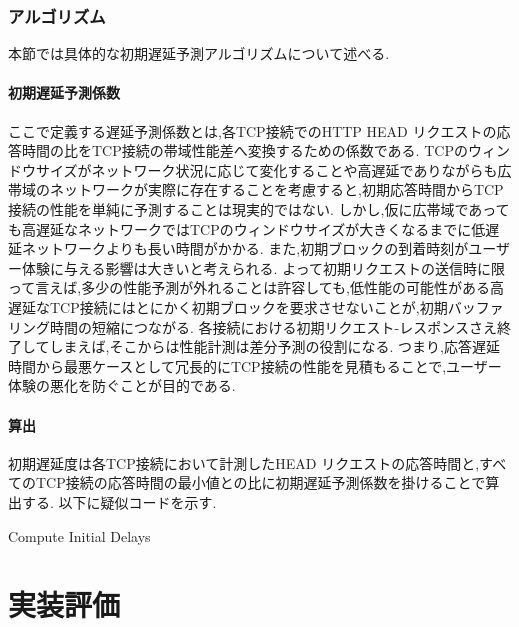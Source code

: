 \documentclass[a4j,12pt]{gradthesis_utf8}
\begin{document}
\newpage

\subsection{アルゴリズム}
\label{yosokuhouhou}
本節では具体的な初期遅延予測アルゴリズムについて述べる.

\subsubsection{初期遅延予測係数}
ここで定義する遅延予測係数とは,各TCP接続でのHTTP HEAD リクエストの応答時間の比をTCP接続の帯域性能差へ変換するための係数である.
TCPのウィンドウサイズがネットワーク状況に応じて変化することや高遅延でありながらも広帯域のネットワークが実際に存在することを考慮すると,初期応答時間からTCP接続の性能を単純に予測することは現実的ではない.
しかし,仮に広帯域であっても高遅延なネットワークではTCPのウィンドウサイズが大きくなるまでに低遅延ネットワークよりも長い時間がかかる.
また,初期ブロックの到着時刻がユーザー体験に与える影響は大きいと考えられる.
よって初期リクエストの送信時に限って言えば,多少の性能予測が外れることは許容しても,低性能の可能性がある高遅延なTCP接続にはとにかく初期ブロックを要求させないことが,初期バッファリング時間の短縮につながる.
各接続における初期リクエスト-レスポンスさえ終了してしまえば,そこからは性能計測は差分予測の役割になる.
つまり,応答遅延時間から最悪ケースとして冗長的にTCP接続の性能を見積もることで,ユーザー体験の悪化を防ぐことが目的である.

\subsubsection{算出}
初期遅延度は各TCP接続において計測したHEAD リクエストの応答時間と,すべてのTCP接続の応答時間の最小値との比に初期遅延予測係数を掛けることで算出する.
以下に疑似コードを示す.

\begin{algorithm}
	\caption{Compute Initial Delays}
	\begin{algorithmic}[1]
		\EndFor
	\end{algorithmic}
	
\end{algorithm}


\chapter{実装評価}\label{sec:sec4}
\end{document}
